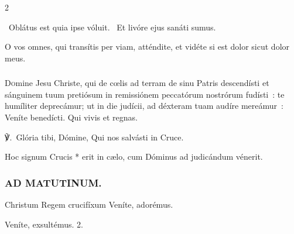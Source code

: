 \documentclass[9pt,twoside]{extarticle}
\begin{document}
\begin{multicols}{2}
{{{\begin{tightlist}{}
\item {}~Oblátus est quia ipse vóluit. ~Et livóre ejus sanáti sumus.
\item {} O vos omnes, qui transítis per viam, atténdite, et vidéte si est dolor sicut dolor meus.
\end{tightlist}

\subsubsection*{\center {}}
\lettrine{D}omine Jesu Christe, qui de cœlis ad terram de sinu Patris descendísti et sánguinem tuum pretiósum in remissiónem peccatórum nostrórum fudísti~: te humíliter deprecámur; ut in die judícii, ad déxteram tuam audíre mereámur~: Veníte benedícti. Qui vivis et regnas.

\begin{tightlist}{}
\item {} ℣.~Glória tibi, Dómine, Qui nos salvásti in Cruce.
\item {}
\item {} Hoc signum Crucis * erit in cælo, cum Dóminus ad judicándum vénerit.
\end{tightlist}

\subsubsection*{\center \textsc{AD MATUTINUM.}}
\begin{tightlist}{}
\item {} Christum Regem crucifíxum \textred{*} Veníte, adorémus.
\item {} Veníte, exsultémus. 2. 
\end{tightlist}
}}}
\end{multicols}
\end{document}
